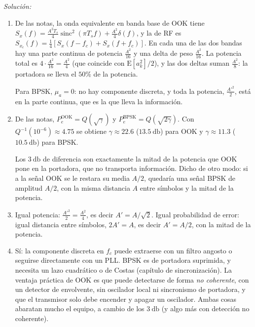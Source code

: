 \documentclass[a4paper,11pt]{article}
\DeclareMathOperator{\sinc}{sinc}
\newcommand{\E}[1]{\mathrm{E}\left[#1\right]}
\newenvironment{solucion}[1][]{
\noindent \large \textsl{Solución:} \ifthenelse{\equal{#1}{}}{}{\emph{(#1)}}

\smallskip
}{
\bigskip
}
\begin{document}
\begin{solucion}
\begin{enumerate}
\item De las notas, la onda equivalente en banda base de OOK tiene $S_x(f)=\frac{A^2T_s}{4}\sinc^2(\pi T_sf)+\frac{A^2}{4}\delta(f)$, y la de RF es $S_{x_c}(f)=\frac14\left[S_x(f-f_c)+S_x(f+f_c)\right]$. En cada una de las dos bandas hay una parte continua de potencia $\frac{A^2}{16}$ y una delta de peso $\frac{A^2}{16}$. La potencia total es $4\cdot\frac{A^2}{16}=\frac{A^2}{4}$ (que coincide con $\E{a_k^2}/2$), y las dos deltas suman $\frac{A^2}{8}$: la portadora se lleva el $50\%$ de la potencia.

Para BPSK, $\mu_a=0$: no hay componente discreta, y toda la potencia, $\frac{A'^2}{2}$, está en la parte continua, que es la que lleva la información.
\item De las notas, $P_e^{\text{OOK}}=Q(\sqrt{\gamma})$ y $P_e^{\text{BPSK}}=Q(\sqrt{2\gamma})$. Con $Q^{-1}(10^{-6})\approx4.75$ se obtiene $\gamma\approx22.6$ ($13.5\ \unit{\decibel}$) para OOK y $\gamma\approx11.3$ ($10.5\ \unit{\decibel}$) para BPSK.

Los $3\ \unit{\decibel}$ de diferencia son exactamente la mitad de la potencia que OOK pone en la portadora, que no transporta información. Dicho de otro modo: si a la señal OOK se le restara su media $A/2$, quedaría una señal BPSK de amplitud $A/2$, con la misma distancia $A$ entre símbolos y la mitad de la potencia.
\item Igual potencia: $\frac{A'^2}{2}=\frac{A^2}{4}$, es decir $A'=A/\sqrt2$. Igual probabilidad de error: igual distancia entre símbolos, $2A'=A$, es decir $A'=A/2$, con la mitad de la potencia.
\item Sí: la componente discreta en $f_c$ puede extraerse con un filtro angosto o seguirse directamente con un PLL. BPSK es de portadora suprimida, y necesita un lazo cuadrático o de Costas (capítulo de sincronización). La ventaja práctica de OOK es que puede detectarse de forma \emph{no coherente}, con un detector de envolvente, sin oscilador local ni sincronismo de portadora, y que el transmisor solo debe encender y apagar un oscilador. Ambas cosas abaratan mucho el equipo, a cambio de los $3\ \unit{\decibel}$ (y algo más con detección no coherente).
\end{enumerate}
\end{solucion}
\end{document}
